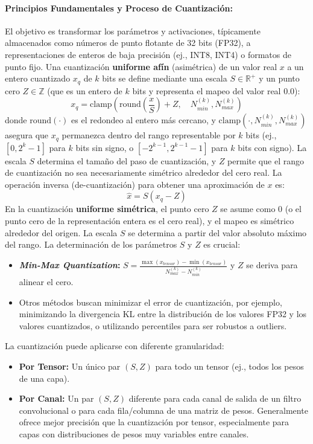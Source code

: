 \documentclass[12pt]{article}
\begin{document}
\paragraph{Principios Fundamentales y Proceso de Cuantización:}
El objetivo es transformar los parámetros y activaciones, típicamente almacenados como números de punto flotante de 32 bits (FP32), a representaciones de enteros de baja precisión (ej., INT8, INT4) o formatos de punto fijo.
Una cuantización \textbf{uniforme afín} (asimétrica) de un valor real $x$ a un entero cuantizado $x_q$ de $k$ bits se define mediante una escala $S \in \mathbb{R}^+$ y un punto cero $Z \in \mathbb{Z}$ (que es un entero de $k$ bits y representa el mapeo del valor real $0.0$):
\begin{equation}
x_q = \text{clamp} \left( \text{round}\left(\frac{x}{S}\right) + Z, \quad N_{min}^{(k)}, N_{max}^{(k)} \right)
\label{eq:quantization_affine}
\end{equation}
donde $\text{round}(\cdot)$ es el redondeo al entero más cercano, y $\text{clamp}(\cdot, N_{min}^{(k)}, N_{max}^{(k)})$ asegura que $x_q$ permanezca dentro del rango representable por $k$ bits (ej., $[0, 2^k-1]$ para $k$ bits sin signo, o $[-2^{k-1}, 2^{k-1}-1]$ para $k$ bits con signo). La escala $S$ determina el tamaño del paso de cuantización, y $Z$ permite que el rango de cuantización no sea necesariamente simétrico alrededor del cero real. La operación inversa (de-cuantización) para obtener una aproximación de $x$ es:
\begin{equation}
\hat{x} = S (x_q - Z)
\label{eq:dequantization_affine}
\end{equation}
En la cuantización \textbf{uniforme simétrica}, el punto cero $Z$ se asume como $0$ (o el punto cero de la representación entera es el cero real), y el mapeo es simétrico alrededor del origen. La escala $S$ se determina a partir del valor absoluto máximo del rango.
La determinación de los parámetros $S$ y $Z$ es crucial:
\begin{itemize}
    \item \textbf{\textit{Min-Max Quantization}:} $S = \frac{\max(x_{tensor}) - \min(x_{tensor})}{N_{max}^{(k)} - N_{min}^{(k)}}$ y $Z$ se deriva para alinear el cero.
    \item Otros métodos buscan minimizar el error de cuantización, por ejemplo, minimizando la divergencia KL entre la distribución de los valores FP32 y los valores cuantizados, o utilizando percentiles para ser robustos a outliers.
\end{itemize}
La cuantización puede aplicarse con diferente granularidad:
\begin{itemize}
    \item \textbf{Por Tensor:} Un único par $(S, Z)$ para todo un tensor (ej., todos los pesos de una capa).
    \item \textbf{Por Canal:} Un par $(S, Z)$ diferente para cada canal de salida de un filtro convolucional o para cada fila/columna de una matriz de pesos. Generalmente ofrece mejor precisión que la cuantización por tensor, especialmente para capas con distribuciones de pesos muy variables entre canales.
\end{itemize}
\end{document}
